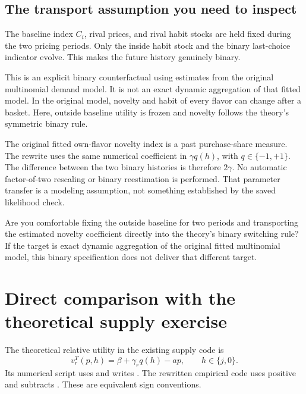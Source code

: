 \documentclass[11pt]{article}
\newcommand{\code}[1]{\texttt{\detokenize{#1}}}
\newcommand{\review}[1]{\begin{tcolorbox}[colback=pale,colframe=navy,title=Decision to verify]#1\end{tcolorbox}}
\newcommand{\important}[1]{\begin{tcolorbox}[colback=white,colframe=warning]#1\end{tcolorbox}}
\begin{document}
\subsection{The transport assumption you need to inspect}
The baseline index $C_i$, rival prices, and rival habit stocks are held fixed during the two pricing periods. Only the inside habit stock and the binary last-choice indicator evolve. This makes the future history genuinely binary.

\important{This is an explicit binary counterfactual using estimates from the original multinomial demand model. It is not an exact dynamic aggregation of that fitted model. In the original model, novelty and habit of every flavor can change after a basket. Here, outside baseline utility is frozen and novelty follows the theory's symmetric binary rule.}

The original fitted own-flavor novelty index is a past purchase-share measure. The rewrite uses the same numerical coefficient in $\gamma q(h)$, with $q\in\{-1,+1\}$. The difference between the two binary histories is therefore $2\gamma$. No automatic factor-of-two rescaling or binary reestimation is performed. That parameter transfer is a modeling assumption, not something established by the saved likelihood check.

\review{Are you comfortable fixing the outside baseline for two periods and transporting the estimated novelty coefficient directly into the theory's binary switching rule? If the target is exact dynamic aggregation of the original fitted multinomial model, this binary specification does not deliver that different target.}

\section{Direct comparison with the theoretical supply exercise}
The theoretical relative utility in the existing supply code is
\[
 v_r^T(p,h)=\beta+\gamma_r q(h)-a p,
 \qquad h\in\{j,0\}.
\]
Its numerical script uses \code{ALPHA=-a} and writes \code{BETA + ALPHA*p}. The rewritten empirical code uses positive \code{alpha=a_i} and subtracts \code{alpha*p}. These are equivalent sign conventions.
\end{document}
